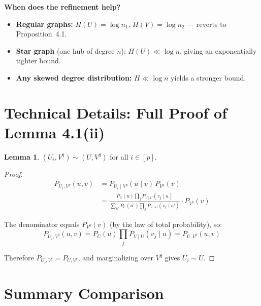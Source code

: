 \documentclass[12pt,a4paper]{article}
\theoremstyle{definition}
\newtheorem{lemma}[theorem]{Lemma}
\begin{document}
\textbf{When does the refinement help?}
\begin{itemize}
  \item \textbf{Regular graphs:} $H(U) = \log n_1$, $H(V) = \log n_2$ — reverts to Proposition~4.1.
  \item \textbf{Star graph} (one hub of degree $n$): $H(U) \ll \log n$, giving an exponentially tighter
    bound.
  \item \textbf{Any skewed degree distribution:} $H \ll \log n$ yields a stronger bound.
\end{itemize}

\section{Technical Details: Full Proof of Lemma 4.1(ii)}

\begin{lemma}
  $(U_i, V^q) \sim (U, V^q)$ for all $i \in [p]$.
\end{lemma}

\begin{proof}
  \begin{align*}
    P_{U_i, V^q}(u,v)
    &= P_{U_i \mid V^q}(u \mid v)\,P_{V^q}(v) \\
    &= \frac{P_U(u)\prod_j P_{V \mid U}(v_j \mid u)}{\sum_{u'} P_U(u')\prod_j P_{V \mid U}(v_j \mid u')}
       \cdot P_{V^q}(v)
  \end{align*}

  The denominator equals $P_{V^q}(v)$ (by the law of total probability), so:
  \[
    P_{U_i, V^q}(u,v) = P_U(u)\prod_j P_{V \mid U}(v_j \mid u) = P_{U, V^q}(u,v)
  \]

  Therefore $P_{U_i, V^q} = P_{U, V^q}$, and marginalizing over $V^q$ gives $U_i \sim U$.
\end{proof}

\section{Summary Comparison}
\end{document}
